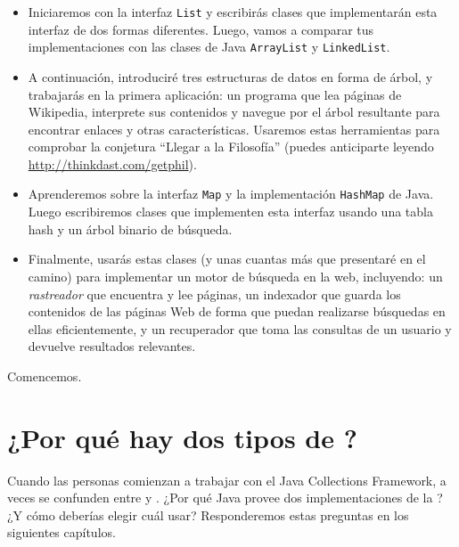 \documentclass[12pt]{book}
\theoremstyle{exercise}
\begin{document}
\begin{itemize}

\item Iniciaremos con la interfaz {\tt List} y escribirás clases que
implementarán esta interfaz de dos formas diferentes. Luego, vamos a
comparar tus implementaciones con las clases de Java {\tt ArrayList} y
{\tt LinkedList}.


\item A continuación, introduciré tres estructuras de datos en forma de árbol, y
trabajarás en la primera aplicación: un programa que lea páginas de Wikipedia,
interprete sus contenidos y navegue por el árbol resultante para encontrar enlaces
y otras características. Usaremos estas herramientas para comprobar la conjetura
``Llegar a la Filosofía'' (puedes anticiparte leyendo \url{http://thinkdast.com/getphil}).


\item Aprenderemos sobre la interfaz {\tt Map} y la implementación
{\tt HashMap} de Java. Luego escribiremos clases que implementen
esta interfaz usando una tabla hash y un árbol binario de búsqueda.


\item Finalmente, usarás estas clases (y unas cuantas más que presentaré en
el camino) para implementar un motor de búsqueda en la web, incluyendo: un \textit{rastreador} que
encuentra y lee páginas, un indexador que guarda los contenidos de las páginas Web de forma que puedan
realizarse búsquedas en ellas eficientemente, y un recuperador que toma las consultas de un usuario
y devuelve resultados relevantes.


\end{itemize}

Comencemos.


\section{¿Por qué hay dos tipos de ?}
\label{why-are-there-two-kinds-of-list}

Cuando las personas comienzan a trabajar con el Java Collections
Framework, a veces se confunden entre  y
.  ¿Por qué Java provee dos implementaciones de
la  ? ¿Y cómo deberías elegir cuál usar?
Responderemos estas preguntas en los siguientes capítulos.
\end{document}

